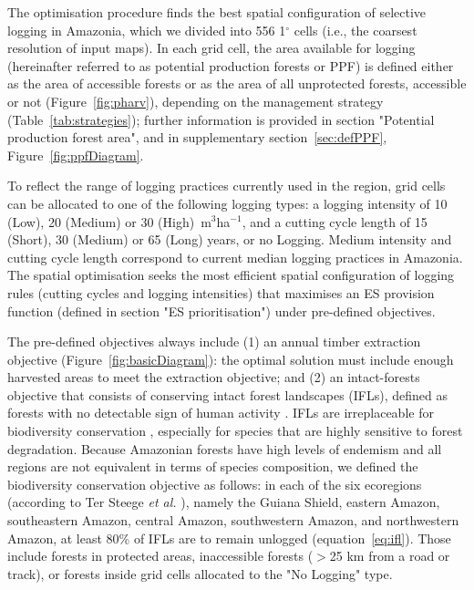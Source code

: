 \documentclass[12pt]{article}
\begin{document}
The optimisation procedure finds the best spatial configuration of selective logging in Amazonia, which we divided into 556 1$^{\circ}$ cells (i.e., the coarsest resolution of input maps). In each grid cell, the area available for logging (hereinafter referred to as potential production forests or PPF) is defined either as the area of accessible forests or as the area of all unprotected forests, accessible or not (Figure~\ref{fig:pharv}), depending on the management strategy (Table~\ref{tab:strategies}); further information is provided in section "Potential production forest area", and in supplementary section~\ref{sec:defPPF}, Figure~\ref{fig:ppfDiagram}. 

To reflect the range of logging practices currently used in the region, grid cells can be allocated to one of the following logging types: a logging intensity of 10 (Low), 20 (Medium) or 30 (High)~m$^3$ha$^{−1}$, and a cutting cycle length of 15 (Short), 30 (Medium) or 65 (Long) years, or no Logging. Medium intensity and cutting cycle length correspond to current median logging practices in Amazonia.
The spatial optimisation seeks the most efficient spatial configuration of logging rules (cutting cycles and logging intensities) that maximises an ES provision function (defined in section "ES prioritisation") under pre-defined objectives. 

The pre-defined objectives always include (1) an annual timber extraction objective (Figure~\ref{fig:basicDiagram}): the optimal solution must include enough harvested areas to meet the extraction objective; and (2) an intact-forests objective that consists of conserving intact forest landscapes (IFLs), defined as forests with no detectable sign of human activity \cite{Potapov2017}. IFLs are irreplaceable for biodiversity conservation \cite{Gibson2011}, especially for species that are highly sensitive to forest degradation. Because Amazonian forests have high levels of endemism and all regions are not equivalent in terms of species composition, we defined the biodiversity conservation objective as follows: in each of the six ecoregions (according to Ter Steege \textit{et al.} \cite{TerSteege2013}), namely the Guiana Shield, eastern Amazon, southeastern Amazon, central Amazon, southwestern Amazon, and northwestern Amazon, at least 80\% of IFLs are to remain unlogged (equation~\ref{eq:ifl}). Those include forests in protected areas, inaccessible forests ($>$25 km from a road or track), or forests inside grid cells allocated to the "No Logging" type. 
\end{document}
